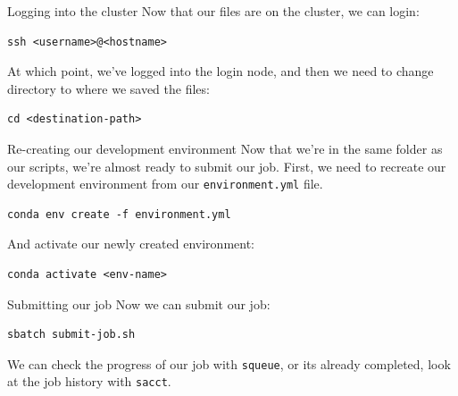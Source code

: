 \documentclass[10pt]{beamer}
\begin{document}
\begin{frame}[label={sec:orgdc1c815},fragile]{Logging into the cluster}
 Now that our files are on the cluster, we can login:

\begin{verbatim}
ssh <username>@<hostname>
\end{verbatim}

At which point, we've logged into the login node, and then we need to change
directory to where we saved the files:

\begin{verbatim}
cd <destination-path>
\end{verbatim}
\end{frame}

\begin{frame}[label={sec:orgb2dc446},fragile]{Re-creating our development environment}
 Now that we're in the same folder as our scripts, we're almost ready to submit
our job. First, we need to recreate our development environment from our
\texttt{environment.yml} file.

\begin{verbatim}
conda env create -f environment.yml
\end{verbatim}

And activate our newly created environment:

\begin{verbatim}
conda activate <env-name>
\end{verbatim}
\end{frame}

\begin{frame}[label={sec:orgdf71181},fragile]{Submitting our job}
 Now we can submit our job:

\begin{verbatim}
sbatch submit-job.sh
\end{verbatim}

We can check the progress of our job with \texttt{squeue}, or its already completed, look
at the job history with \texttt{sacct}.
\end{frame}
\end{document}
